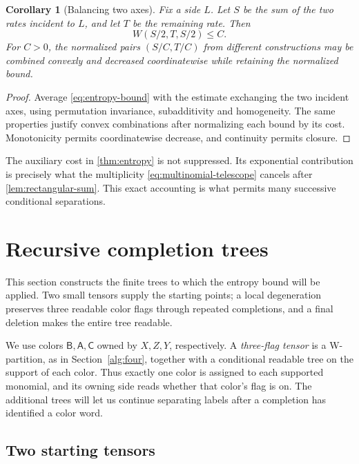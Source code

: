 \documentclass[11pt]{article}
\numberwithin{equation}{section}
\newtheorem{corollary}[theorem]{Corollary}
\theoremstyle{definition}
\theoremstyle{remark}
\begin{document}
\begin{corollary}[Balancing two axes]\label{cor:balance}
Fix a side \(L\).
Let \(S\) be the sum of the two rates incident to \(L\), and let \(T\)
be the remaining rate.  Then
\begin{equation}\label{eq:balanced-rate}
 W(S/2,T,S/2)\le C.
\end{equation}
For \(C>0\), the normalized pairs \((S/C,T/C)\) from different constructions
may be combined convexly and decreased coordinatewise while retaining
the normalized bound.
\end{corollary}

\begin{proof}
Average \eqref{eq:entropy-bound} with the estimate exchanging the two
incident axes, using permutation invariance, subadditivity and
homogeneity.  The same properties justify convex combinations after
normalizing each bound by its cost.  Monotonicity permits coordinatewise
decrease, and continuity permits closure.
\end{proof}

The auxiliary cost in \cref{thm:entropy} is not suppressed.
Its exponential contribution is precisely what the multiplicity
\eqref{eq:multinomial-telescope} cancels after
\cref{lem:rectangular-sum}.
This exact accounting is what permits many successive conditional
separations.

\section{Recursive completion trees}\label{sec:completion}

This section constructs the finite trees to which the entropy bound
will be applied.  Two small tensors supply the starting points;
a local degeneration preserves three readable color flags through
repeated completions, and a final deletion makes the entire tree
readable.

We use colors \(\mathsf B,\mathsf A,\mathsf C\) owned by \(X,Z,Y\), respectively.
A \emph{three-flag tensor} is a W-partition, as in
Section~\ref{alg:four}, together with a conditional readable tree on
the support of each color.  Thus exactly one color is assigned to
each supported monomial, and its owning side reads whether that
color's flag is on.  The additional trees will let us continue
separating labels after a completion has identified a color word.

\subsection{Two starting tensors}
\end{document}

